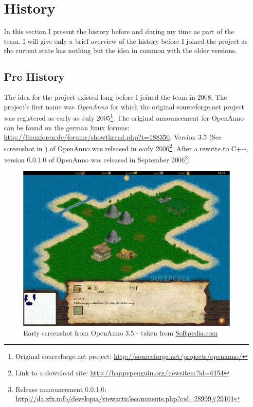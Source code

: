 \section{History}
In this section I present the history before and during my time as part of the \UH{} team. I will give only a brief
overview of the history before I joined the project as the current state has nothing but the idea in common with the
older versions.

\subsection{Pre History}
The idea for the \UH{} project existed long before I joined the team in 2008. The project's first name was \textit{OpenAnno}
for which the original sourceforge.net project was registered as early as July 2005\footnote{Original sourceforge.net
project: \url{http://sourceforge.net/projects/openanno/}}. The original announcement for OpenAnno can be found on the
german linux forums: \url{http://linuxforen.de/forums/showthread.php?t=188350}. Version 3.5 (See screenshot in ) of OpenAnno was released in
early 2006\footnote{Link to a download site: \url{http://happypenguin.org/newsitem?id=6154}}. After a rewrite to C++,
version 0.0.1.0 of OpenAnno was released in September 2006\footnote{Release announcement 0.0.1.0:
\url{http://da.zfx.info/developia/viewarticlecomments.php?cid=28999\#29101}}. 

\begin{figure}[!htb]
	\begin{center}
		\includegraphics[scale=0.50]{pics/openannoscreenshot}
	\end{center}
    \caption{Early screenshot from OpenAnno 3.5 - taken from
    \href{http://mac.softpedia.com/progScreenshots/OpenAnno-Screenshot-13550.html}{Softpedia.com}}
    \label{oascreenshot}
\end{figure}

